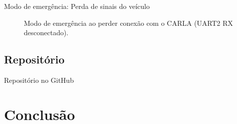 \documentclass{if-beamer}
\begin{document}
\begin{frame}{Modo de emergência: Perda de sinais do veículo}
	
	\begin{figure}[H]
		\centering
		\caption{Modo de emergência ao perder conexão com o CARLA (UART2 RX desconectado).}
		\label{fig:microautoware_lost_carla}
	\end{figure}

\end{frame}

\subsection*{Repositório}

\begin{frame}{Repositório no GitHub}
	
	
	
\end{frame}


\section{Conclusão}
\end{document}
